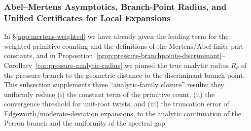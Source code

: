 
\subsubsection{Abel--Mertens Asymptotics, Branch-Point Radius, and Unified Certificates for Local Expansions}\label{app:sync-kernel-weighted-abel-mertens-analytic-radius-edgeworth}
In \S\ref{app:mertens-weighted} we have already given the leading term for the weighted primitive counting and the definitions of the Mertens/Abel finite-part constants,
and in Proposition~\ref{prop:pressure-branchpoints-discriminant}--Corollary~\ref{cor:pressure-analytic-radius} we pinned the true analytic radius \(R_\theta\) of the pressure branch to the geometric distance to the discriminant branch point.
This subsection supplements three ``analytic-family closure'' results: they uniformly reduce (i) the constant term of the primitive count, (ii) the convergence threshold for unit-root twists, and (iii) the truncation error of Edgeworth/moderate-deviation expansions, to the analytic continuation of the Perron branch and the uniformity of the spectral gap.

